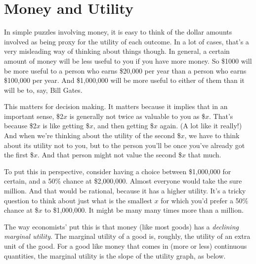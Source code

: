 \section{Money and Utility}
In simple puzzles involving money, it is easy to think of the dollar amounts involved as being proxy for the utility of each outcome. In a lot of cases, that's a very misleading way of thinking about things though. In general, a certain amount of money will be less useful to you if you have more money. So \$1000 will be more useful to a person who earns \$20,000 per year than a person who earns \$100,000 per year. And \$1,000,000 will be more useful to either of them than it will be to, say, Bill Gates.

This matters for decision making. It matters because it implies that in an important sense, \$2$x$ is generally not twice as valuable to you as \$$x$. That's because \$2$x$ is like getting \$$x$, and then getting \$$x$ again. (A lot like it really!) And when we're thinking about the utility of the second \$$x$, we have to think about its utility not to you, but to the person you'll be once you've already got the first \$$x$. And that person might not value the second \$$x$ that much.

To put this in perspective, consider having a choice between \$1,000,000 for certain, and a 50\% chance at \$2,000,000. Almost everyone would take the sure million. And that would be rational, because it has a higher utility. It's a tricky question to think about just what is the smallest $x$ for which you'd prefer a 50\% chance at \$$x$ to \$1,000,000. It might be many many times more than a million.

The way economists' put this is that money (like most goods) has a \textit{declining marginal utility}. The marginal utility of a good is, roughly, the utility of an extra unit of the good. For a good like money that comes in (more or less) continuous quantities, the marginal utility is the slope of the utility graph, as below.

